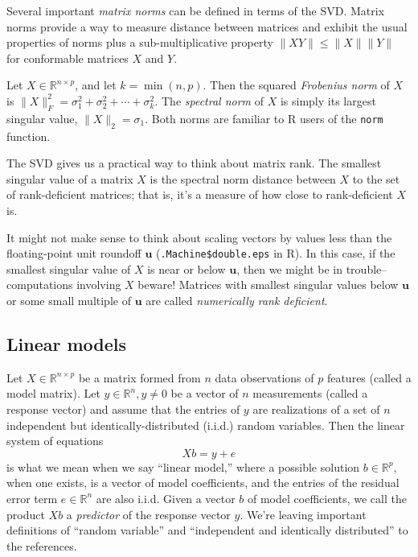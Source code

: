 \documentclass[10pt]{article} %
\newcommand{\R}{{\mathbb R}}
\begin{document}
Several important {\it matrix norms} can be defined in terms of the SVD.
Matrix norms provide a way to measure distance between matrices and exhibit
the usual properties of norms plus a sub-multiplicative property
$\|X Y\| \le \|X\| \|Y\|$ for conformable matrices $X$ and $Y$.

Let $X\in\R^{n\times p}$, and let $k=\min(n, p)$. Then the squared
{\it Frobenius norm} of $X$ is
$\|X\|_F^2 = \sigma_1^2 + \sigma_2^2 + \cdots + \sigma_k^2$.
The {\it spectral norm} of $X$ is simply its largest singular value,
$\|X\|_2 = \sigma_1$. Both norms are familiar to R users of the
{\tt norm} function.



The SVD gives us a practical way to think about matrix rank.  The smallest
singular value of a matrix $X$ is the spectral norm distance between $X$ to the
set of rank-deficient matrices; that is, it's a measure of how close to
rank-deficient $X$ is.

It might not make sense to think about scaling vectors by values less than the
floating-point unit roundoff $\mathbf{u}$ ({\tt .Machine\$double.eps} in R). In
this case, if the smallest singular value of $X$ is near or below $\mathbf{u}$,
then we might be in trouble--computations involving $X$ beware!  Matrices with
smallest singular values below $\mathbf{u}$ or some small multiple of
$\mathbf{u}$  are called {\it numerically rank deficient}.



\subsection*{Linear models}

Let $X\in\R^{n\times p}$ be a matrix formed from $n$ data observations of $p$
features (called a model matrix).  Let $y\in\R^n, y\ne 0$ be a vector of $n$
measurements (called a response vector) and assume that the entries of $y$
are realizations of a set of $n$ independent but identically-distributed
(i.i.d.) random variables.  Then the linear system of equations
\begin{equation}\label{linear}
Xb = y + e
\end{equation}
is what we mean when we say ``linear model,'' where a possible solution
$b\in\R^p$, when one exists, is a vector of model coefficients, and the
entries of the residual error term $e\in\R^n$ are also i.i.d. 
Given a vector $b$ of model
coefficients, we call the product $Xb$ a {\it predictor} of the response vector
$y$.  We're leaving important definitions of ``random variable'' and
``independent and identically distributed'' to the references.
\end{document}

